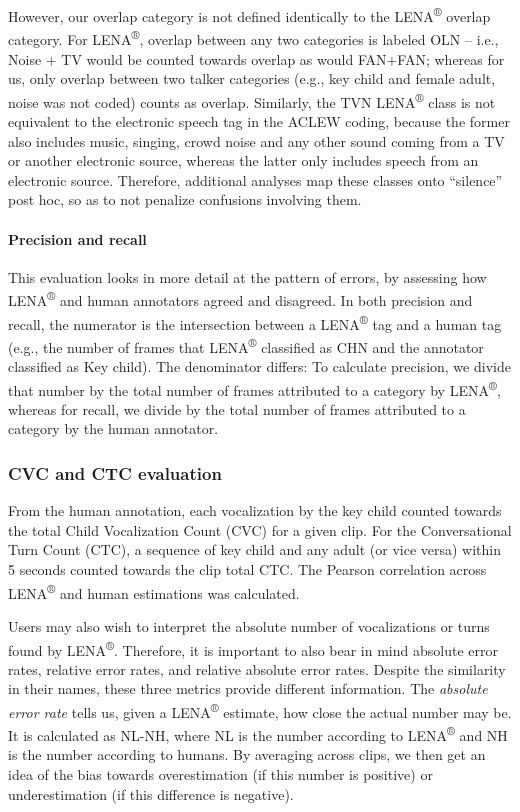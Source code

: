 \documentclass[english,floatsintext,man]{apa6}
\begin{document}
However, our overlap category is not defined identically to the
LENA\textsuperscript{®} overlap category. For LENA\textsuperscript{®},
overlap between any two categories is labeled OLN -- i.e., Noise + TV
would be counted towards overlap as would FAN+FAN; whereas for us, only
overlap between two talker categories (e.g., key child and female adult,
noise was not coded) counts as overlap. Similarly, the TVN
LENA\textsuperscript{®} class is not equivalent to the electronic speech
tag in the ACLEW coding, because the former also includes music,
singing, crowd noise and any other sound coming from a TV or another
electronic source, whereas the latter only includes speech from an
electronic source. Therefore, additional analyses map these classes onto
\enquote{silence} post hoc, so as to not penalize confusions involving
them.

\paragraph{Precision and recall}\label{precision-and-recall}

This evaluation looks in more detail at the pattern of errors, by
assessing how LENA\textsuperscript{®} and human annotators agreed and
disagreed. In both precision and recall, the numerator is the
intersection between a LENA\textsuperscript{®} tag and a human tag
(e.g., the number of frames that LENA\textsuperscript{®} classified as
CHN and the annotator classified as Key child). The denominator differs:
To calculate precision, we divide that number by the total number of
frames attributed to a category by LENA\textsuperscript{®}, whereas for
recall, we divide by the total number of frames attributed to a category
by the human annotator.

\subsubsection{CVC and CTC evaluation}\label{cvc-and-ctc-evaluation}

From the human annotation, each vocalization by the key child counted
towards the total Child Vocalization Count (CVC) for a given clip. For
the Conversational Turn Count (CTC), a sequence of key child and any
adult (or vice versa) within 5 seconds counted towards the clip total
CTC. The Pearson correlation across LENA\textsuperscript{®} and human
estimations was calculated.

Users may also wish to interpret the absolute number of vocalizations or
turns found by LENA\textsuperscript{®}. Therefore, it is important to
also bear in mind absolute error rates, relative error rates, and
relative absolute error rates. Despite the similarity in their names,
these three metrics provide different information. The \emph{absolute
error rate} tells us, given a LENA\textsuperscript{®} estimate, how
close the actual number may be. It is calculated as NL-NH, where NL is
the number according to LENA\textsuperscript{®} and NH is the number
according to humans. By averaging across clips, we then get an idea of
the bias towards overestimation (if this number is positive) or
underestimation (if this difference is negative).
\end{document}
